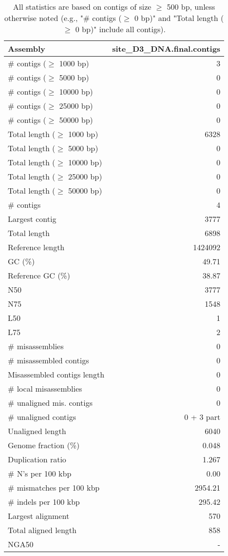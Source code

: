 \documentclass[12pt,a4paper]{article}
\begin{document}
\begin{table}[ht]
\begin{center}
\caption{All statistics are based on contigs of size $\geq$ 500 bp, unless otherwise noted (e.g., "\# contigs ($\geq$ 0 bp)" and "Total length ($\geq$ 0 bp)" include all contigs).}
\begin{tabular}{|l*{1}{|r}|}
\hline
Assembly & site\_D3\_DNA.final.contigs \\ \hline
\# contigs ($\geq$ 1000 bp) & 3 \\ \hline
\# contigs ($\geq$ 5000 bp) & 0 \\ \hline
\# contigs ($\geq$ 10000 bp) & 0 \\ \hline
\# contigs ($\geq$ 25000 bp) & 0 \\ \hline
\# contigs ($\geq$ 50000 bp) & 0 \\ \hline
Total length ($\geq$ 1000 bp) & 6328 \\ \hline
Total length ($\geq$ 5000 bp) & 0 \\ \hline
Total length ($\geq$ 10000 bp) & 0 \\ \hline
Total length ($\geq$ 25000 bp) & 0 \\ \hline
Total length ($\geq$ 50000 bp) & 0 \\ \hline
\# contigs & 4 \\ \hline
Largest contig & 3777 \\ \hline
Total length & 6898 \\ \hline
Reference length & 1424092 \\ \hline
GC (\%) & 49.71 \\ \hline
Reference GC (\%) & 38.87 \\ \hline
N50 & 3777 \\ \hline
N75 & 1548 \\ \hline
L50 & 1 \\ \hline
L75 & 2 \\ \hline
\# misassemblies & 0 \\ \hline
\# misassembled contigs & 0 \\ \hline
Misassembled contigs length & 0 \\ \hline
\# local misassemblies & 0 \\ \hline
\# unaligned mis. contigs & 0 \\ \hline
\# unaligned contigs & 0 + 3 part \\ \hline
Unaligned length & 6040 \\ \hline
Genome fraction (\%) & 0.048 \\ \hline
Duplication ratio & 1.267 \\ \hline
\# N's per 100 kbp & 0.00 \\ \hline
\# mismatches per 100 kbp & 2954.21 \\ \hline
\# indels per 100 kbp & 295.42 \\ \hline
Largest alignment & 570 \\ \hline
Total aligned length & 858 \\ \hline
NGA50 & - \\ \hline
\end{tabular}
\end{center}
\end{table}
\end{document}
